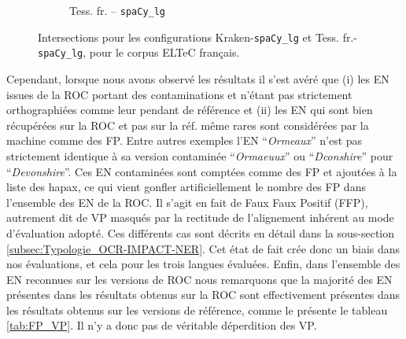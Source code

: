 \begin{figure}[h!]
\begin{minipage}{6.5cm}
\begin{subfigure}{1\textwidth}
  \caption{Tess. fr. -- \texttt{spaCy\_lg}}
  \end{subfigure}
    \end{minipage}
\caption{Intersections pour les configurations Kraken-\texttt{spaCy\_lg} et Tess. fr.-\texttt{spaCy\_lg}, pour le corpus ELTeC français.}
\label{fig:intersection_globale-kraken-tess}
\end{figure}

Cependant, lorsque nous avons observé les résultats il s'est avéré que (i) les EN issues de la ROC portant des contaminations et n'étant pas strictement orthographiées comme leur pendant de référence et (ii) les EN qui sont bien récupérées sur la ROC et pas sur la réf. même rares sont considérées par la machine comme des FP. Entre autres exemples l'EN ``\textit{Ormeaux}'' n'est pas strictement identique à sa version contaminée ``\textit{Ormaeuux}'' ou ``\textit{Dconshire}'' pour ``\textit{Devonshire}''. Ces EN contaminées sont comptées comme des FP et ajoutées à la liste des hapax, ce qui vient gonfler artificiellement le nombre des FP dans l'ensemble des EN de la ROC. Il s'agit en fait de Faux Faux Positif (FFP), autrement dit de VP masqués par la rectitude de l'alignement inhérent au mode d'évaluation adopté. Ces différents cas sont décrits en détail dans la sous-section \ref{subsec:Typologie_OCR-IMPACT-NER}. Cet état de fait crée donc un biais dans nos évaluations, et cela pour les trois langues évaluées.
 Enfin, dans l'ensemble des EN reconnues sur les versions de ROC nous remarquons que la majorité des EN présentes dans les résultats obtenus sur la ROC sont effectivement présentes dans les résultats obtenus sur les versions de référence, comme le présente le tableau \ref{tab:FP_VP}. Il n'y a donc pas de véritable déperdition des VP. 


